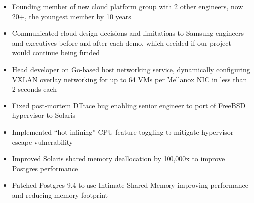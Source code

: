 \documentclass{res}
\begin{document}
\begin{resume}
\begin{itemize}
  \item Founding member of new cloud platform group with 2 other engineers, now 20+, the youngest member by 10 years
  \item Communicated cloud design decisions and limitations to Samsung engineers and executives before and after each demo, which decided if our project would continue being funded
  \item Head developer on Go-based host networking service, dynamically configuring VXLAN overlay networking for up to 64 VMs per Mellanox NIC in less than 2 seconds each
  \item Fixed post-mortem DTrace bug enabling senior engineer to port of FreeBSD hypervisor to Solaris
  \item Implemented ``hot-inlining'' CPU feature toggling to mitigate hypervisor escape vulnerability
  \item Improved Solaris shared memory deallocation by 100,000x to improve Postgres performance %
  \item Patched Postgres 9.4 to use Intimate Shared Memory improving performance and reducing memory footprint %
\end{itemize}


\end{resume}
\end{document}
